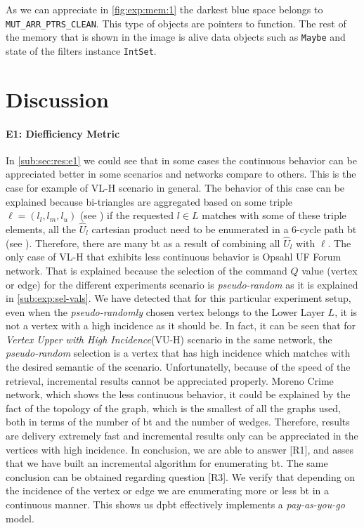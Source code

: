 As we can appreciate in \autoref{fig:exp:mem:1} the darkest blue space belongs to \\ \texttt{MUT_ARR_PTRS_CLEAN}. This type of objects are pointers to function.
The rest of the memory that is shown in the image is alive data objects such as \texttt{Maybe} and state of the filters instance \texttt{IntSet}. 

\section{Discussion}\label{sec:exp:discussion}
\paragraph{E1: Diefficiency Metric} In \autoref{sub:sec:res:e1} we could see that in some cases the continuous behavior can be appreciated better in some scenarios and networks compare to others. This is the case for example of VL-H scenario in general. 
The behavior of this case can be explained because bi-triangles are aggregated based on some triple $\ell = (l_l,l_m,l_u)$ (see ) if the requested $l \in L$ matches with some of these triple elements, all the $\hat{U}_l$ cartesian product need to be enumerated in a 6-cycle path \acrshort{bt} (see ). Therefore, there are many \acrshort{bt} as a result of combining all $\hat{U}_l$ with $\ell$.
The only case of VL-H that exhibits less continuous behavior is Opsahl UF Forum network. That is explained because the selection of the command $Q$ value (vertex or edge) for the different experiments scenario is \emph{pseudo-random} as it is explained in \autoref{sub:exp:sel-vals}. 
We have detected that for this particular experiment setup, even when the \emph{pseudo-randomly} chosen vertex belongs to the Lower Layer $L$, it is not a vertex with a high incidence as it should be.
In fact, it can be seen that for \emph{Vertex Upper with High Incidence}(VU-H) scenario in the same network, the \emph{pseudo-random} selection is a vertex that has high incidence which matches with the desired semantic of the scenario. 
Unfortunatelly, because of the speed of the retrieval, incremental results cannot be appreciated properly.
Moreno Crime network, which shows the less continuous behavior, it could be explained by the fact of the topology of the graph, which is the smallest of all the graphs used, both in terms of the number of \acrshort{bt} and the number of wedges.
Therefore, results are delivery extremely fast and incremental results only can be appreciated in the vertices with high incidence.
In conclusion, we are able to answer [R1], and asses that we have built an incremental algorithm for enumerating \acrlong{bt}. 
The same conclusion can be obtained regarding question [R3]. We verify that depending on the incidence of the vertex or edge we are enumerating more or less \acrshort{bt} in a continuous manner. This shows us \acrshort{dpbt} effectively implements a \emph{pay-as-you-go} model.

